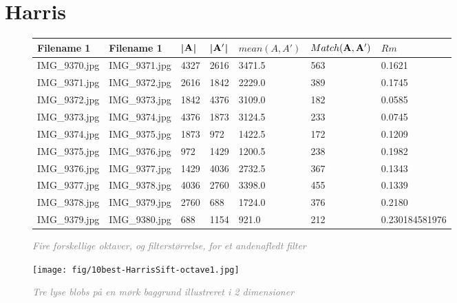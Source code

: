 \section{Harris}


\begin{figure}[H]
    \centering
    \begin{center}    
    \begin{tabular}{ | l | l | l | l | l | l | l |}
    \hline
    Filename 1 & Filename 1 & |$\bold{A}$| & |$\bold{A'}$| & $mean(A,A')$ & $Match(\bold{A}, \bold{A}')$ & $Rm$ \\ \hline
IMG\_9370.jpg &	IMG\_9371.jpg &	4327 &	2616 &	3471.5 &	563 &	0.1621\\ \hline
IMG\_9371.jpg &	IMG\_9372.jpg &	2616 &	1842 &	2229.0 &	389 &	0.1745\\ \hline
IMG\_9372.jpg &	IMG\_9373.jpg &	1842 &	4376 &	3109.0 &	182 &	0.0585\\ \hline
IMG\_9373.jpg &	IMG\_9374.jpg &	4376 &	1873 &	3124.5 &	233 &	0.0745\\ \hline
IMG\_9374.jpg &	IMG\_9375.jpg &	1873 &	972 &	1422.5 &	172 &	0.1209\\ \hline
IMG\_9375.jpg &	IMG\_9376.jpg &	972 &	1429 &	1200.5 &	238 &	0.1982\\ \hline
IMG\_9376.jpg &	IMG\_9377.jpg &	1429 &	4036 &	2732.5 &	367 &	0.1343\\ \hline
IMG\_9377.jpg &	IMG\_9378.jpg &	4036 &	2760 &	3398.0 &	455 &	0.1339\\ \hline
IMG\_9378.jpg &	IMG\_9379.jpg &	2760 &	688 &	1724.0 &	376 &	0.2180\\ \hline
IMG\_9379.jpg &	IMG\_9380.jpg &	688 &	1154 &	921.0 &	212 &	0.230184581976\\ \hline
    \end{tabular}       
    \caption{\textcolor{gray}{\footnotesize \textit{Fire forskellige oktaver, og filterstørrelse, for et andenafledt filter}}}
    \label{tab:HARRISOCTAVE2}
     \end{center}
     \vspace{-2.5em}
\end{figure} \noindent


\begin{figure}[H]
    \centering
    \texttt{[image: fig/10best-HarrisSift-octave1.jpg]}
    \vspace{-0.5em}   
    \begin{center}
    \caption{\textcolor{gray}{\footnotesize \textit{
    Tre lyse blobs på en mørk baggrund illustreret i 2 dimensioner \cite{blob}}}}
    \label{fig:lindblob}
     \end{center}
  \end{figure}
       \vspace{-2.7em}
\noindent





